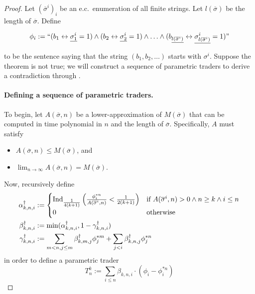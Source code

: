 \documentclass[authordate,onecolumn,noenvironments]{miri-tech-article}
\numberwithin{equation}{subsection}
\renewcommand{\iff}{\leftrightarrow}
\newcommand{\quot}[1]{``#1"}
\newcommand{\enc}[1]{{\underline{#1}}}
\newcommand{\seq}[1]{{\overline{#1}}}
\newcommand{\nn}{n}
\newcommand{\ec}[1][\ ]{e.c.#1}
\newcommand{\gens}{\dagger}
\newcommand{\gen}[1]{{#1^\gens}}
\newcommand{\ctsind}[1]{\operatorname{Ind}_{\text{\small{${#1}$}}}} %
\begin{document}
\begin{proof}

\newcommand{\Purchased}{\mathrm{Purchased}}
\newcommand{\MeanPayout}{\mathrm{MeanPayout}}
\newcommand{\MaxPayout}{\mathrm{MaxPayout}}

Let $(\seq{\sigma}^i)_i$ be an \ec enumeration of all finite strings.  Let $l(\seq{\sigma})$ be the length of $\seq{\sigma}$.  Define

\[
  \phi_i := \quot{
    (b_1 \iff \enc{\sigma^i_1}=1) \land
    (b_2 \iff \enc{\sigma^i_2}=1) \land
    \ldots \land
    (b_{\enc{l(\seq{\sigma}^i)}} \iff \enc{\sigma^i_{l(\seq{\sigma}^i)}}=1)}
\]

  to be the sentence saying that the string $(b_1, b_2, \ldots)$ starts with $\sigma^i$.  Suppose the theorem is not true; we will construct
a sequence of parametric traders to derive a contradiction through .


\paragraph{Defining a sequence of parametric traders.}
To begin, let $A(\seq{\sigma}, \nn)$ be a lower-approximation of $M(\seq{\sigma})$ that can be computed in time polynomial in $n$ and the length of $\seq{\sigma}$.  Specifically, $A$ must satisfy
\begin{itemize}
  \item
   $A(\seq{\sigma}, \nn) \leq M(\seq{\sigma})$, and 
   \item
   $\lim_{\nn \to \infty} A(\seq{\sigma}, \nn) = M(\seq{\sigma})$.
\end{itemize}
  Now, recursively define
\begin{align*}
  \gen{\alpha_{k,n,i}} &:= \begin{cases}
  \ctsind{\frac{1}{4(k+1)}} \left( \frac{ \phi_i^{* n}}{ A(\seq{\sigma}^i, n) } < \frac{1}{2(k+1)} \right) & \text{if } A(\seq{\sigma}^i, n) > 0 \wedge n \geq k \wedge i \leq n \\
    0 & \text{otherwise}
  \end{cases}
    \\
  \gen{\beta_{k,n,i}} &:= \min(\gen{\alpha_{k,n,i}}, 1 - \gen{\gamma_{k,n,i}})
  \\
  \gen{\gamma_{k,n,i}} &:= \sum_{m < n, j \leq m} \gen{\beta_{k, m, j}} {\phi}_j^{* m} + \sum_{j < i} \gen{\beta_{k, n, j}} \phi_j^{* n}
\end{align*}
in order to define a parametric trader
\[
  T^k_n := \sum_{i \leq n} \beta_{k,n,i} \cdot (\phi_i - \phi_i^{* n})
\]


\end{proof}
\end{document}
